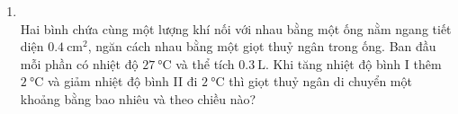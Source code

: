 \begin{enumerate}[label=\bfseries Câu \arabic*:, leftmargin=1.7cm]
\item {}\\
Hai bình chứa cùng một lượng khí nối với nhau bằng một ống nằm ngang tiết diện $\SI{0.4}{\centi\meter^2}$, ngăn cách nhau bằng một giọt thuỷ ngân trong ống. Ban đầu mỗi phần có nhiệt độ $\SI{27}{\celsius}$ và thể tích $\SI{0.3}{\liter}$. Khi tăng nhiệt độ bình I thêm $\SI{2}{\celsius}$ và giảm nhiệt độ bình II đi $\SI{2}{\celsius}$ thì giọt thuỷ ngân di chuyển một khoảng bằng bao nhiêu và theo chiều nào?
\end{enumerate}







